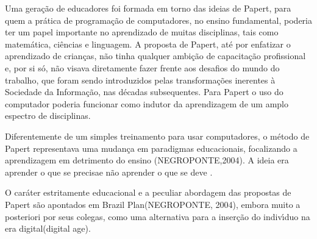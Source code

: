 \documentclass[
12pt,		%
openright,	%
twoside,  %
a4paper,			%
chapter=TITLE,		%
english,			%
french,				%
spanish,			%
brazil				%
]{USPSC-classe/USPSC}
\begin{document}
Uma gera\c{c}\~ao de educadores foi formada em torno das ideias de Papert, para quem a pr\'atica de programa\c{c}\~ao de computadores, no ensino fundamental, poderia ter um papel importante no aprendizado de muitas disciplinas, tais como matem\'atica, ci\^encias e linguagem. A proposta de Papert, at\'e por enfatizar o aprendizado de crian\c{c}as, n\~ao tinha qualquer ambi\c{c}\~ao de capacita\c{c}\~ao profissional e, por si s\'o, n\~ao visava diretamente fazer frente aos desafios do \textquotedbl mundo do trabalho\textquotedbl , que foram sendo introduzidos pelas transforma\c{c}\~oes inerentes \`a Sociedade da Informa\c{c}\~ao, nas d\'ecadas subsequentes. Para Papert o uso do computador poderia funcionar como indutor da aprendizagem de um amplo espectro de disciplinas.

















Diferentemente de um simples treinamento para usar computadores, o m\'etodo de Papert representava uma mudan\c{c}a em paradigmas educacionais, focalizando a aprendizagem em detrimento do ensino  (NEGROPONTE,2004). A ideia era \textquotedbl  aprender o que se precisa\textquotedbl  e n\~ao \textquotedbl aprender o que se deve \textquotedbl .

















O car\'ater estritamente educacional e a peculiar abordagem das propostas de Papert s\~ao apontados em \textquotedbl Brazil Plan\textquotedbl  (NEGROPONTE, 2004), embora muito a posteriori por seus colegas, como uma alternativa para a inser\c{c}\~ao do indiv\'{\i}duo na \textquotedbl era digital\textquotedbl  (digital age).
\end{document}
